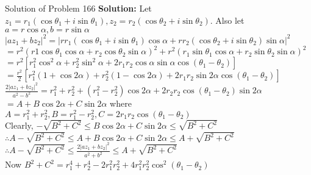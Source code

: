 \documentclass[aspectratio=169,8pt]{beamer}
\begin{document}
\begin{frame}{Solution of Problem 166}
  \textbf{Solution:} Let $z_1 = r_1(\cos\theta_1 + i\sin\theta_1), z_2 = r_2(\cos\theta_2 + i\sin\theta_2)$. Also let $a =
  r\cos\alpha, b = r\sin\alpha$\\
  \vspace*{0.2cm}
  $|az_1 + bz_2|^2 = |rr_1(\cos\theta_1 + i\sin\theta_1)\cos\alpha + rr_2(\cos\theta_2 + i\sin\theta_2)\sin\alpha|^2$\\
  \vspace*{0.2cm}
  $= r^2(r1\cos\theta_1\cos\alpha + r_2\cos\theta_2\sin\alpha)^2 + r^2(r_1\sin\theta_1\cos\alpha + r_2\sin\theta_2\sin\alpha)^2$\\
  \vspace*{0.2cm}
  $= r^2[r_1^2\cos^2\alpha + r_2^2\sin^2\alpha + 2r_1r_2\cos\alpha\sin\alpha\cos(\theta_1 - \theta_2)]$\\
  \vspace*{0.2cm}
  $= \frac{r^2}{2}[r_1^2(1 + \cos2\alpha) + r_2^2(1 - \cos2\alpha) + 2r_1r_2\sin2\alpha\cos(\theta_1 - \theta_2)]$\\
  \vspace*{0.2cm}
  $\frac{2|az_1 + bz_2|^2}{a^2 - b^2}= r_1^2 + r_2^2 + (r_1^2 - r_2^2)\cos2\alpha + 2r_2r_2\cos(\theta_1 - \theta_2)\sin2\alpha$\\
  \vspace*{0.2cm}
  $= A + B\cos2\alpha + C\sin2\alpha$ where $A = r_1^2 + r_2^2, B = r_1^2- r_2^2, C = 2r_1r_2\cos(\theta_1 - \theta_2)$\\
  \vspace*{0.2cm}
  Clearly, $-\sqrt{B^2 + C^2}\leq B\cos2\alpha + C\sin2\alpha \leq \sqrt{B^2 + C^2}$\\
  \vspace*{0.2cm}
  $\therefore A -\sqrt{B^2 + C^2}\leq A + B\cos2\alpha + C\sin2\alpha \leq A + \sqrt{B^2 + C^2}$\\
  \vspace*{0.2cm}
  $\therefore A -\sqrt{B^2 + C^2}\leq  \frac{2|az_1 + bz_2|^2}{a^2 + b^2}\leq A + \sqrt{B^2 + C^2}$\\
  \vspace*{0.2cm}
  Now $B^2 + C^2 = r_1^4 + r_2^4 - 2r_1^2r_2^2 + 4r_1^2r_2^2\cos^2(\theta_1 - \theta_2)$
\end{frame}
\end{document}

